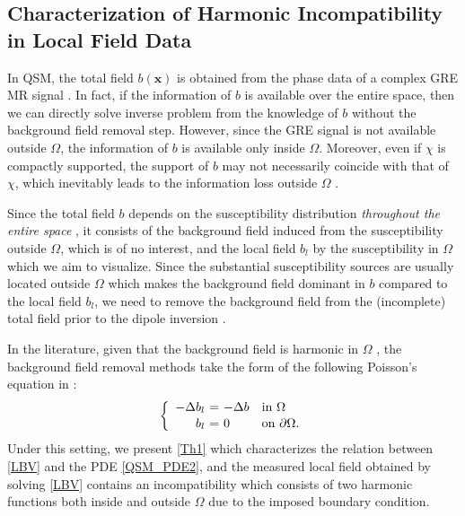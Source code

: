 \documentclass[reqno]{siamonline1116}
\numberwithin{theorem}{section}
\numberwithin{equation}{section}
\def\Om{\Omega}
\def\p{\partial}
\def\x{\boldsymbol{x}}
\begin{document}
\subsection{Characterization of Harmonic Incompatibility in Local Field Data}\label{LocalFieldAcquisition}

In QSM, the total field $b(\x)$ is obtained from the phase data of a complex GRE MR signal \cite{F.Schweser2016,Y.Wang2015}. In fact, if the information of $b$ is available over the entire space, then we can directly solve inverse problem from the knowledge of $b$ without the background field removal step. However, since the GRE signal is not available outside $\Om$, the information of $b$ is available only inside $\Om$. Moreover, even if $\chi$ is compactly supported, the support of $b$ may not necessarily coincide with that of $\chi$, which inevitably leads to the information loss outside $\Om$ \cite{F.Schweser2016,Y.Wang2015}.

Since the total field $b$ depends on the susceptibility distribution \emph{throughout the entire space} \cite{F.Schweser2016}, it consists of the background field induced from the susceptibility outside $\Om$, which is of no interest, and the local field $b_l$ by the susceptibility in $\Om$ which we aim to visualize. Since the substantial susceptibility sources are usually located outside $\Om$ which makes the background field dominant in $b$ compared to the local field $b_l$, we need to remove the background field from the (incomplete) total field prior to the dipole inversion \cite{F.Schweser2016,Y.Wang2015}.

In the literature, given that the background field is harmonic in $\Om$ \cite{Y.Wang2015,D.Zhou2014}, the background field removal methods take the form of the following Poisson's equation in \cite{D.Zhou2014}:
\begin{align}\label{LBV}
\left\{\begin{array}{rcll}
-\Delta b_l\hspace{-0.65em}&=\hspace{-0.65em}&-\Delta b&\text{in}~\Om \vspace{0.125em}\\
b_l\hspace{-0.65em}&=\hspace{-0.65em}&0&\text{on}~\p\Om.
\end{array}\right.
\end{align}
Under this setting, we present \cref{Th1} which characterizes the relation between \cref{LBV} and the PDE \cref{QSM_PDE2}, and the measured local field obtained by solving \cref{LBV} contains an incompatibility which consists of two harmonic functions both inside and outside $\Om$ due to the imposed boundary condition.
\end{document}
